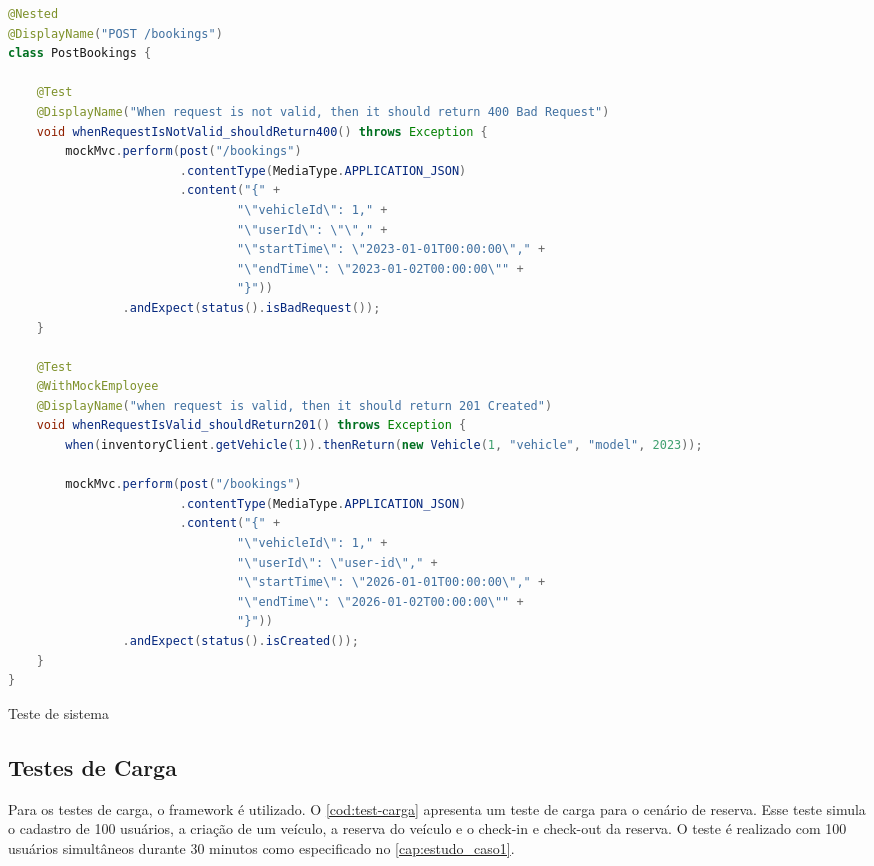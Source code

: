 \begin{codigo}[H]
    \begin{lstlisting}[language=Java]
@Nested
@DisplayName("POST /bookings")
class PostBookings {

    @Test
    @DisplayName("When request is not valid, then it should return 400 Bad Request")
    void whenRequestIsNotValid_shouldReturn400() throws Exception {
        mockMvc.perform(post("/bookings")
                        .contentType(MediaType.APPLICATION_JSON)
                        .content("{" +
                                "\"vehicleId\": 1," +
                                "\"userId\": \"\"," +
                                "\"startTime\": \"2023-01-01T00:00:00\"," +
                                "\"endTime\": \"2023-01-02T00:00:00\"" +
                                "}"))
                .andExpect(status().isBadRequest());
    }

    @Test
    @WithMockEmployee
    @DisplayName("when request is valid, then it should return 201 Created")
    void whenRequestIsValid_shouldReturn201() throws Exception {
        when(inventoryClient.getVehicle(1)).thenReturn(new Vehicle(1, "vehicle", "model", 2023));

        mockMvc.perform(post("/bookings")
                        .contentType(MediaType.APPLICATION_JSON)
                        .content("{" +
                                "\"vehicleId\": 1," +
                                "\"userId\": \"user-id\"," +
                                "\"startTime\": \"2026-01-01T00:00:00\"," +
                                "\"endTime\": \"2026-01-02T00:00:00\"" +
                                "}"))
                .andExpect(status().isCreated());
    }
}
    \end{lstlisting}
    \caption{Teste de sistema}
    \label{cod:test-sistema}
\end{codigo}

\subsection{Testes de Carga}
Para os testes de carga, o framework  é utilizado. O \autoref{cod:test-carga} apresenta um teste de carga para o cenário de reserva. Esse teste simula o cadastro de 100 usuários, a criação de um veículo, a reserva do veículo e o check-in e check-out da reserva. O teste é realizado com 100 usuários simultâneos durante 30 minutos como especificado no \autoref{cap:estudo_caso1}.

